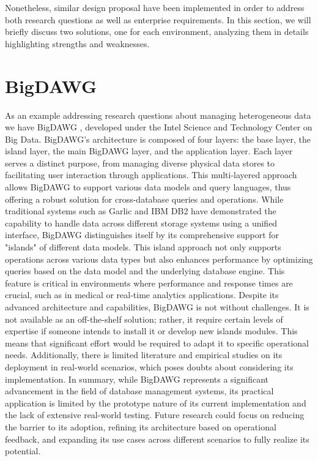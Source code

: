 Nonetheless, similar design proposal have been implemented in order to address both research questions as well as enterprise requirements. In this section, we will briefly discuss two solutions, one for each environment, analyzing them in details highlighting strengths and weaknesses.

\section{BigDAWG}
As an example addressing research questions about managing heterogeneous data we have BigDAWG \cite{DBLP:conf/hpec/GadepallyCDEHKM16}, developed under the Intel Science and Technology Center on Big Data. BigDAWG's architecture is composed of four layers: the base layer, the island layer, the main BigDAWG layer, and the application layer. Each layer serves a distinct purpose, from managing diverse physical data stores to facilitating user interaction through applications. This multi-layered approach allows BigDAWG to support various data models and query languages, thus offering a robust solution for cross-database queries and operations.
While traditional systems such as Garlic and IBM DB2 have demonstrated the capability to handle data across different storage systems using a unified interface, BigDAWG distinguishes itself by its comprehensive support for "islands" of different data models. This island approach not only supports operations across various data types but also enhances performance by optimizing queries based on the data model and the underlying database engine. This feature is critical in environments where performance and response times are crucial, such as in medical or real-time analytics applications.
Despite its advanced architecture and capabilities, BigDAWG is not without challenges. It is not available as an off-the-shelf solution; rather, it require certain levels of expertise if someone intends to install it or develop new islands modules. This means that significant effort would be required to adapt it to specific operational needs. Additionally, there is limited literature and empirical studies on its deployment in real-world scenarios, which poses doubts about considering its implementation.
In summary, while BigDAWG represents a significant advancement in the field of database management systems, its practical application is limited by the prototype nature of its current implementation and the lack of extensive real-world testing. Future research could focus on reducing the barrier to its adoption, refining its architecture based on operational feedback, and expanding its use cases across different scenarios to fully realize its potential.

